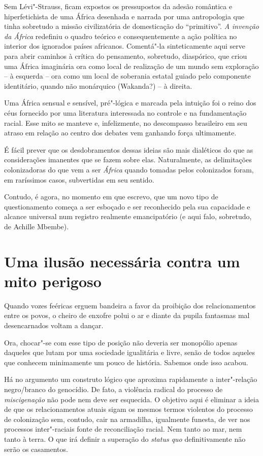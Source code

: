 Sem Lévi"-Strauss, ficam expostos os pressupostos da adesão romântica e
hiperfetichista de uma África desenhada e narrada por uma antropologia
que tinha sobretudo a missão civilizatória de domesticação do
``primitivo''. \emph{A invenção da África} redefiniu o quadro teórico e
consequentemente a ação política no interior dos ignorados países
africanos. Comentá"-la sinteticamente aqui serve para abrir caminhos à
crítica do pensamento, sobretudo, diaspórico, que criou uma África
imaginária ora como local de realização de um mundo sem exploração -- à
esquerda -- ora como um local de soberania estatal guiado pelo
componente identitário, quando não monárquico (Wakanda?) -- à direita.

Uma África sensual e sensível, pré"-lógica e marcada pela intuição foi o
reino dos céus fornecido por uma literatura interessada no controle e na
fundamentação racial. Esse mito se manteve e, infelizmente, no
descompasso brasileiro em seu atraso em relação ao centro dos debates
vem ganhando força ultimamente.

É fácil prever que os desdobramentos dessas ideias são mais dialéticos
do que as considerações imanentes que se fazem sobre elas. Naturalmente,
as delimitações colonizadoras do que vem a ser \emph{África} quando
tomadas pelos colonizados foram, em raríssimos casos, subvertidas em seu
sentido.

Contudo, é agora, no momento em que escrevo, que um novo tipo de
questionamento começa a ser esboçado e ser reconhecido pela sua
capacidade e alcance universal num registro realmente
emancipatório (e aqui falo, sobretudo, de Achille Mbembe).

\chapter{Uma ilusão necessária contra um mito perigoso}

Quando vozes feéricas erguem bandeira a favor da proibição dos
relacionamentos entre os povos, o cheiro de enxofre polui o ar e diante
da pupila fantasmas mal desencarnados voltam a dançar.

Ora, chocar"-se com esse tipo de posição não deveria ser monopólio apenas
daqueles que lutam por uma sociedade igualitária e livre, senão de todos
aqueles que conhecem minimamente um pouco de história. Sabemos onde isso
acabou.

Há no argumento um construto lógico que aproxima rapidamente a
inter"-relação negro/branco do genocídio. De fato, a violência radical do
processo de \emph{miscigenação} não pode nem deve ser
esquecida. O objetivo aqui é
eliminar a ideia de que os relacionamentos atuais sigam os mesmos termos
violentos do processo de colonização sem, contudo, cair na armadilha,
igualmente funesta, de ver nos processos inter"-raciais fonte de
reconciliação racial. Nem tanto ao mar, nem tanto à terra. O que irá
definir a superação do \emph{status quo} definitivamente não serão os
casamentos.

